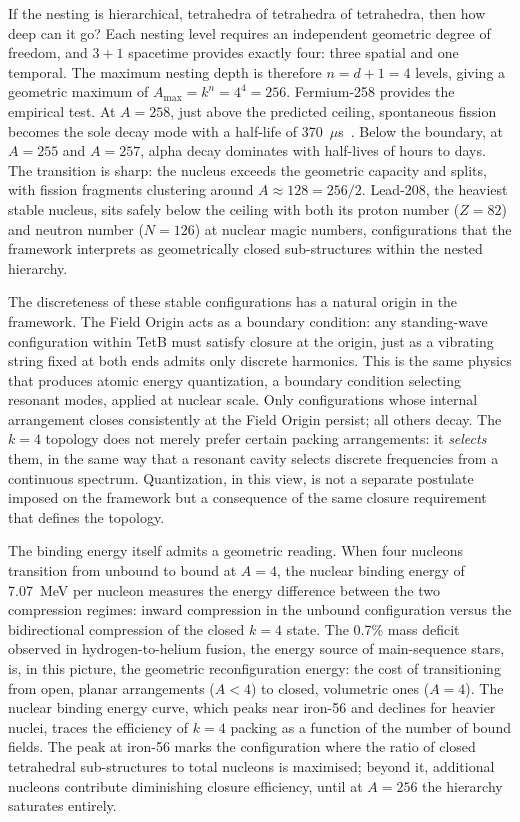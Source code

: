 \documentclass[aps,prd,preprint,superscriptaddress,showpacs,preprintnumbers,amsmath,amssymb,nofootinbib]{revtex4-2}
\begin{document}
If the nesting is hierarchical, tetrahedra of tetrahedra of tetrahedra, then how deep can it go? Each nesting level requires an independent geometric degree of freedom, and $3 + 1$ spacetime provides exactly four: three spatial and one temporal. The maximum nesting depth is therefore $n = d + 1 = 4$ levels, giving a geometric maximum of $A_{\max} = k^n = 4^4 = 256$. Fermium-258 provides the empirical test. At $A = 258$, just above the predicted ceiling, spontaneous fission becomes the sole decay mode with a half-life of 370~$\mu$s~\cite{hoffman2000}. Below the boundary, at $A = 255$ and $A = 257$, alpha decay dominates with half-lives of hours to days. The transition is sharp: the nucleus exceeds the geometric capacity and splits, with fission fragments clustering around $A \approx 128 = 256/2$. Lead-208, the heaviest stable nucleus, sits safely below the ceiling with both its proton number ($Z = 82$) and neutron number ($N = 126$) at nuclear magic numbers, configurations that the framework interprets as geometrically closed sub-structures within the nested hierarchy.

The discreteness of these stable configurations has a natural origin in the framework. The Field Origin acts as a boundary condition: any standing-wave configuration within TetB must satisfy closure at the origin, just as a vibrating string fixed at both ends admits only discrete harmonics. This is the same physics that produces atomic energy quantization, a boundary condition selecting resonant modes, applied at nuclear scale. Only configurations whose internal arrangement closes consistently at the Field Origin persist; all others decay. The $k = 4$ topology does not merely prefer certain packing arrangements: it \emph{selects} them, in the same way that a resonant cavity selects discrete frequencies from a continuous spectrum. Quantization, in this view, is not a separate postulate imposed on the framework but a consequence of the same closure requirement that defines the topology.

The binding energy itself admits a geometric reading. When four nucleons transition from unbound to bound at $A = 4$, the nuclear binding energy of 7.07~MeV per nucleon measures the energy difference between the two compression regimes: inward compression in the unbound configuration versus the bidirectional compression of the closed $k = 4$ state. The 0.7\% mass deficit observed in hydrogen-to-helium fusion, the energy source of main-sequence stars, is, in this picture, the geometric reconfiguration energy: the cost of transitioning from open, planar arrangements ($A < 4$) to closed, volumetric ones ($A = 4$). The nuclear binding energy curve, which peaks near iron-56 and declines for heavier nuclei, traces the efficiency of $k = 4$ packing as a function of the number of bound fields. The peak at iron-56 marks the configuration where the ratio of closed tetrahedral sub-structures to total nucleons is maximised; beyond it, additional nucleons contribute diminishing closure efficiency, until at $A = 256$ the hierarchy saturates entirely.
\end{document}
